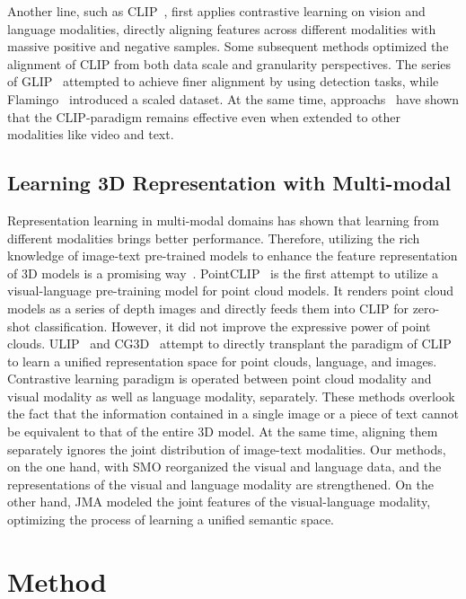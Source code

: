 \documentclass[sigconf]{acmart}
\begin{document}
Another line, such as CLIP~\cite{radford2021learning}, first applies contrastive learning on vision and language modalities, directly aligning features across different modalities with massive positive and negative samples. Some subsequent methods optimized the alignment of CLIP from both data scale and granularity perspectives. The series of GLIP~\cite{li2022grounded, zhang2022glipv2} attempted to achieve finer alignment by using detection tasks, while Flamingo~\cite{alayrac2022flamingo} introduced a scaled dataset. At the same time, approachs~\cite{luo2022clip4clip, li2022align, xu2021videoclip, ju2022prompting, FeiMatchStruICML22, ma2022xclip} have shown that the CLIP-paradigm remains effective even when extended to other modalities like video and text.
 
\subsection{Learning 3D Representation with Multi-modal}
Representation learning in multi-modal domains has shown that learning from different modalities brings better performance. Therefore, utilizing the rich knowledge of image-text pre-trained models to enhance the feature representation of 3D models is a promising way~\cite{chen2021multimodal, yanlet, ma2023xmesh}. PointCLIP~\cite{zhang2022pointclip} is the first attempt to utilize a visual-language pre-training model for point cloud models. It renders point cloud models as a series of depth images and directly feeds them into CLIP for zero-shot classification. However, it did not improve the expressive power of point clouds. ULIP~\cite{xue2022ulip} and CG3D~\cite{hegde2023clip} attempt to directly transplant the paradigm of CLIP to learn a unified representation space for point clouds, language, and images. Contrastive learning paradigm is operated between point cloud modality and visual modality as well as language modality, separately. These methods overlook the fact that the information contained in a single image or a piece of text cannot be equivalent to that of the entire 3D model. At the same time, aligning them separately ignores the joint distribution of image-text modalities. Our methods, on the one hand, with SMO reorganized the visual and language data, and the representations of the visual and language modality are strengthened. On the other hand, JMA modeled the joint features of the visual-language modality, optimizing the process of learning a unified semantic space.

\section{Method}
\end{document}
